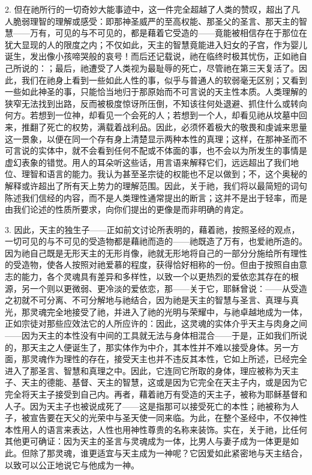 2. 但在祂所行的一切奇妙大能事迹中，这一件完全超越了人类的赞叹，超出了凡人脆弱理智的理解或感受：即那神圣威严的至高权能、那圣父的圣言、那天主的智慧——万有，可见的与不可见的，都是藉着它受造的——竟能被相信存在于那位在犹大显现的人的限度之内；不仅如此，天主的智慧竟能进入妇女的子宫，作为婴儿诞生，发出像小孩啼哭般的哀号！而后还记载说，祂在临终时极其忧伤，正如祂自己所说的：；最后，祂遭受了人类视为最耻辱的死亡，尽管祂在第三天复活了。因此，我们在祂身上看到一些如此人性的事，似乎与普通人的软弱毫无区别；又看到一些如此神圣的事，只能恰当地归于那原始而不可言说的天主性本质。人类理解的狭窄无法找到出路，反而被极度惊讶所压倒，不知该往何处退避、抓住什么或转向何方。若想到一位神，却看见一个会死的人；若想到一个人，却看见祂从坟墓中回来，推翻了死亡的权势，满载着战利品。因此，必须怀着极大的敬畏和虔诚来思量这一景象，以便在同一个存有身上清楚显示两种本性的真理；这样，在那神圣而不可言说的实体中，就不会看到任何不配或不体面的事，也不会以为所发生的事情是虚幻表象的错觉。用人的耳朵听这些话，用言语来解释它们，远远超出了我们地位、理智和语言的能力。我认为甚至圣宗徒的权能也不足以做到；不，这个奥秘的解释或许超出了所有天上势力的理解范围。因此，关于祂，我们将以最简短的词句陈述我们信经的内容，而不是人类理性通常提出的断言；这并不是出于轻率，而是由我们论述的性质所要求，向你们提出的更像是而非明确的肯定。\par

3. 因此，天主的独生子——正如前文讨论所表明的，藉着祂，按照圣经的观点，一切可见的与不可见的受造物都是藉祂而造的——祂既造了万有，也爱祂所造的。因为祂自己既是无形天主的无形肖像，祂就无形地将自己的一部分分施给所有理性的受造物，使各人按照对祂爱慕的程度，获得恰好相称的一份。但由于按照自由意志的能力，各个灵魂具有差异和多样性，以致一个以更热烈的爱依恋其存在的根源，另一个则以更微弱、更冷淡的爱依恋，那——关于它，耶稣曾说：——从受造之初就不可分离、不可分解地与祂结合，因为祂是天主的智慧与圣言、真理与真光，那灵魂完全地接受了祂，并进入了祂的光明与荣耀中，与祂卓越地成为一体，正如宗徒对那些应效法它的人所应许的：因此，这灵魂的实体介乎天主与肉身之间——因为天主的本性没有中间的工具就无法与身体相混合——于是，正如我们所说的，那天主之人便诞生了，那实体作为中介，其本性并不难以接受身体。另一方面，那灵魂作为理性的存在，接受天主也并不违反其本性，它如上所述，已经完全进入了那圣言、智慧和真理之中。因此，它连同它所取的身体，理应被称为天主子、天主的德能、基督、天主的智慧，这或是因为它完全在天主子内，或是因为它完全将天主子接受到自己内。再者，藉着祂万有受造的天主子，被称为耶稣基督和人子。因为天主子也被说成死了——这是指那可以接受死亡的本性；祂被称为人子，被宣告要在天父的光荣中与圣天使一同来临。为此，在整个圣经中，不仅神性本性用人的语言来表达，人性也用神性尊贵的名称来装饰。实在，关于祂，比任何其他更可确证：因为天主的圣言与灵魂成为一体，比男人与妻子成为一体更是如此。但除了那灵魂，谁更适宜与天主成为一神呢？它因爱如此紧密地与天主结合，以致可以公正地说它与他成为一神。\par

